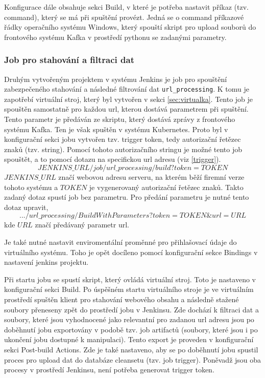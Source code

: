 \documentclass[thesis=M,czech,hidelinks]{FITthesis}[2013/05/06]
\begin{document}
Konfigurace dále obsahuje sekci Build, v které je potřeba nastavit příkaz (tzv. command), který se má při spuštění provézt. Jedná se o command příkazové řádky operačního systému Windows, který spouští skript pro upload souborů do frontového systému Kafka v prostředí pythonu se zadanými parametry.



\subsubsection{Job pro stahování a filtraci dat} \label{sec:jenkinsvirt}
Druhým vytvořeným projektem v systému Jenkins je job pro spouštění zabezpečeného stahování a následné filtrování dat \texttt{url_processing}. K tomu je zapotřebí virtuální stroj, který byl vytvořen v sekci \ref{sec:virtualka}. Tento job je spouštěn samostatně pro každou url, kterou dostává parametrem při spuštění. Tento parametr je předáván ze skriptu, který dostává zprávy z frontového systému Kafka. Ten je však spuštěn v systému Kubernetes. Proto byl v konfigurační sekci jobu vytvořen tzv. trigger token, tedy autorizační řetězec znaků (tzv. string). Pomocí tohoto autorizačního stringu je možné tento job spouštět, a to pomocí dotazu na specifickou url adresu (viz \ref{trigger}).
\begin{equation} \label{trigger}
JENKINS\_URL/job/url\_processing/build?token=TOKEN
\end{equation}
$JENKINS\_URL$ značí webovou adresu serveru, na kterém běží firemní verze tohoto systému a $TOKEN$ je vygenerovaný autorizační řetězec znaků. Takto zadaný dotaz spustí job bez parametru. Pro předání parametru je nutné tento dotaz upravit,
\begin{equation}
.../url\_processing/BuildWithParameters?token=TOKEN\&url=URL
\end{equation}
kde $URL$ značí předávaný parametr url.

Je také nutné nastavit enviromentální proměnné pro přihlašovací údaje do virtuálního systému. Toho je opět docíleno pomocí konfigurační sekce Bindings v nastavení jenkins projektu. 

Při startu jobu se spustí skript, který ovládá virtuální stroj. Toto je nastaveno v konfigurační sekci Build. Po úspěšném startu virtuálního stroje je ve virtuálním prostředí spuštěn klient pro stahování webového obsahu a následně stažené soubory přeneseny zpět do prostředí jobu v Jenkinsu. Zde dochází k filtraci dat a soubory, které jsou vyhodnocené jako relevantní pro zadanou url adresu jsou po doběhnutí jobu exportovány v podobě tzv. job artifactů (soubory, které jsou i po ukončení jobu dostupné k manipulaci). Tento export je proveden v konfigurační sekci Post-build Actions. Zde je také nastaveno, aby se po doběhnutí jobu spustil proces pro upload dat do databáze cleansetu (tzv. job trigger). Poněvadž jsou oba procesy v prostředí Jenkinsu, není potřeba generovat trigger token.
\end{document}
